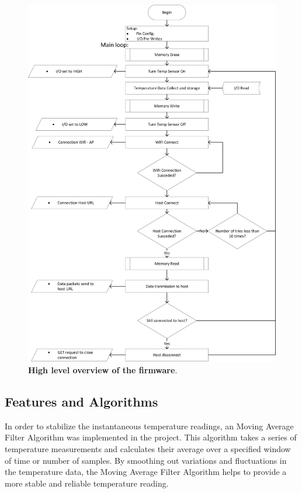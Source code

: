 \begin{figure}[H]
    \centering
    \includegraphics[scale = 0.9]{imagens/FA.png}
    \caption{\textbf{High level overview of the firmware}.}
    \label{02fig:FA}
\end{figure}



\subsection{Features and Algorithms}\label{04Sub:FeaturesAndAlgorithms}

In order to stabilize the instantaneous temperature readings, an Moving Average Filter Algorithm was implemented in the 
project. This algorithm takes a series of temperature measurements and calculates their average over a specified window of 
time or number of samples. By smoothing out variations and fluctuations in the temperature data, the Moving Average Filter 
Algorithm helps to provide a more stable and reliable temperature reading. \\ 


